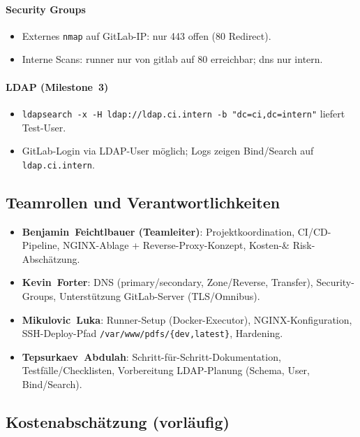 \documentclass[a4paper,12pt]{article}
\begin{document}
\paragraph{Security Groups}
\begin{itemize}
  \item Externes \texttt{nmap} auf GitLab-IP: nur 443 offen (80 Redirect).
  \item Interne Scans: runner nur von gitlab auf 80 erreichbar; dns nur intern.
\end{itemize}

\paragraph{LDAP (Milestone~3)}
\begin{itemize}
  \item \texttt{ldapsearch -x -H ldap://ldap.ci.intern -b "dc=ci,dc=intern"} liefert Test-User.
  \item GitLab-Login via LDAP-User möglich; Logs zeigen Bind/Search auf \texttt{ldap.ci.intern}.
\end{itemize}

\subsection*{Teamrollen und Verantwortlichkeiten}

\begin{itemize}
  \item \textbf{Benjamin~Feichtlbauer (Teamleiter)}: Projektkoordination, CI/CD-Pipeline,
        NGINX-Ablage + Reverse-Proxy-Konzept, Kosten-\& Risk-Abschätzung.
  \item \textbf{Kevin~Forter}: DNS (primary/secondary, Zone/Reverse, Transfer), Security-Groups,
        Unterstützung GitLab-Server (TLS/Omnibus).
  \item \textbf{Mikulovic~Luka}: Runner-Setup (Docker-Executor), NGINX-Konfiguration,
        SSH-Deploy-Pfad \texttt{/var/www/pdfs/\{dev,latest\}}, Hardening.
  \item \textbf{Tepsurkaev~Abdulah}: Schritt-für-Schritt-Dokumentation, Testfälle/Checklisten,
        Vorbereitung LDAP-Planung (Schema, User, Bind/Search).
\end{itemize}

\subsection*{Kostenabschätzung (vorläufig)}
\end{document}
